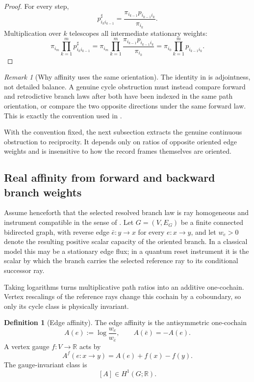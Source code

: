 \documentclass[11pt]{article}
\theoremstyle{definition}
\newtheorem{definition}[theorem]{Definition}
\theoremstyle{remark}
\newtheorem{remark}[theorem]{Remark}
\newcommand{\R}{\mathbb R}
\begin{document}
\begin{proof}
For every step,
\[
 p^\sharp_{i_ki_{k-1}}
 =
 \frac{\pi_{i_{k-1}}p_{i_{k-1}i_k}}{\pi_{i_k}}.
\]
Multiplication over \(k\) telescopes all intermediate stationary weights:
\[
 \pi_{i_m}\prod_{k=1}^m p^\sharp_{i_ki_{k-1}}
 =
 \pi_{i_m}
 \prod_{k=1}^m
 \frac{\pi_{i_{k-1}}p_{i_{k-1}i_k}}{\pi_{i_k}}
 =
 \pi_{i_0}\prod_{k=1}^m p_{i_{k-1}i_k}.
\]
\end{proof}

\begin{remark}[Why affinity uses the same orientation]
\label{rem:same-orientation-affinity}
The identity in  is adjointness, not
detailed balance.  A genuine cycle obstruction must instead compare forward
and retrodictive branch laws after both have been indexed in the same path
orientation, or compare the two opposite directions under the same forward
law.  This is exactly the convention used in
.
\end{remark}

With the convention fixed, the next subsection extracts the genuine continuous
obstruction to reciprocity.  It depends only on ratios of opposite oriented edge
weights and is insensitive to how the record frames themselves are oriented.
\subsection{Real affinity from forward and backward branch weights}

Assume henceforth that the selected resolved branch law is ray homogeneous and
instrument compatible in the sense of
.  Let
$G=(V,E_G)$ be a finite connected bidirected graph, with reverse edge
$\bar e:y\to x$ for every $e:x\to y$, and let $w_e>0$ denote the resulting
positive scalar capacity of the oriented branch.  In a classical model this may
be a stationary edge flux; in a quantum reset instrument it is the scalar by
which the branch carries the selected reference ray to its conditional
successor ray.

Taking logarithms turns multiplicative path ratios into an additive one-cochain.
Vertex rescalings of the reference rays change this cochain by a coboundary, so
only its cycle class is physically invariant.

\begin{definition}[Edge affinity]
\label{def:affinity}
The edge affinity is the antisymmetric one-cochain
\[
 A(e):=\log\frac{w_e}{w_{\bar e}},
 \qquad A(\bar e)=-A(e).
\]
A vertex gauge $f:V\to\R$ acts by
\[
 A^f(e:x\to y)=A(e)+f(x)-f(y).
\]
The gauge-invariant class is
\[
 [A]\in H^1(G;\R).
\]
\end{definition}
\end{document}
